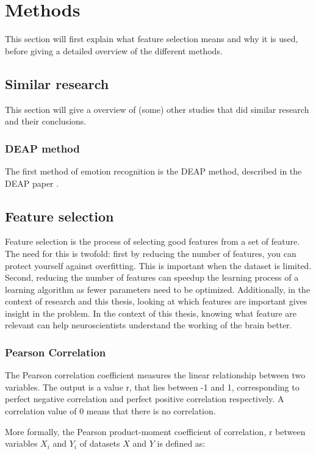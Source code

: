 \chapter{Methods}
{\samenvatting This section will first explain what feature selection means and why it is used, before giving a detailed overview of the different methods.}

\section{Similar research}
This section will give a overview of (some) other studies that did similar research and their conclusions.

\subsection{DEAP method}
The first method of emotion recognition is the DEAP method, described in the DEAP paper \citep{DEAP}.


\section{Feature selection}
Feature selection is the process of selecting good features from a set of feature. The need for this is twofold: first by reducing the number of features, you can protect yourself against overfitting. This is important when the dataset is limited. Second, reducing the number of features can speedup the learning process of a learning algorithm as fewer parameters need to be optimized. Additionally, in the context of research and this thesis, looking at which features are important gives insight in the problem. In the context of this thesis, knowing what feature are relevant can help neuroscientists understand the working of the brain better.

\subsection{Pearson Correlation}
The Pearson correlation coefficient measures the linear relationship between two variables. The output is a value r, that lies between -1 and 1, corresponding to perfect negative correlation and perfect positive correlation respectively. A correlation value of 0 means that there is no correlation.

\npar

More formally\citep{corrPaper}, the Pearson product-moment coefficient of correlation, r between variables $X_i$ and $Y_i$ of datasets $X$ and $Y$ is defined as:


